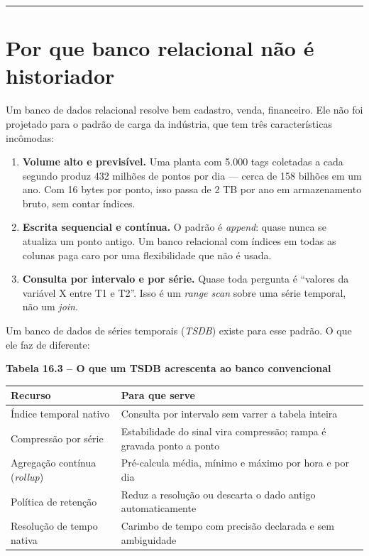 \begin{center}\rule{0.5\linewidth}{0.5pt}\end{center}

\section{Por que banco relacional não é historiador}\label{por-que-banco-relacional-nuxe3o-uxe9-historiador}

Um banco de dados relacional resolve bem cadastro, venda, financeiro. Ele não foi projetado para o
padrão de carga da indústria, que tem três características incômodas:

\begin{enumerate}
\def\labelenumi{\arabic{enumi}.}
\tightlist
\item
  \textbf{Volume alto e previsível.} Uma planta com 5.000 tags coletadas a cada segundo produz
  432 milhões de pontos por dia --- cerca de 158 bilhões em um ano. Com 16 bytes por ponto, isso
  passa de 2 TB por ano em armazenamento bruto, sem contar índices.
\item
  \textbf{Escrita sequencial e contínua.} O padrão é \emph{append}: quase nunca se atualiza um ponto antigo.
  Um banco relacional com índices em todas as colunas paga caro por uma flexibilidade que não é
  usada.
\item
  \textbf{Consulta por intervalo e por série.} Quase toda pergunta é ``valores da variável X entre T1 e
  T2''. Isso é um \emph{range scan} sobre uma série temporal, não um \emph{join}.
\end{enumerate}

Um banco de dados de séries temporais (\emph{TSDB}) existe para esse padrão. O que ele faz de diferente:

\textbf{Tabela 16.3 -- O que um TSDB acrescenta ao banco convencional}

\begin{longtable}[]{@{}
  >{\raggedright\arraybackslash}p{}
  >{\raggedright\arraybackslash}p{}@{}}
\toprule\noalign{}
\begin{minipage}[b]{\linewidth}\raggedright
Recurso
\end{minipage} & \begin{minipage}[b]{\linewidth}\raggedright
Para que serve
\end{minipage} \\
\midrule\noalign{}
\endhead
\bottomrule\noalign{}
\endlastfoot
Índice temporal nativo & Consulta por intervalo sem varrer a tabela inteira \\
Compressão por série & Estabilidade do sinal vira compressão; rampa é gravada ponto a ponto \\
Agregação contínua (\emph{rollup}) & Pré-calcula média, mínimo e máximo por hora e por dia \\
Política de retenção & Reduz a resolução ou descarta o dado antigo automaticamente \\
Resolução de tempo nativa & Carimbo de tempo com precisão declarada e sem ambiguidade \\
\end{longtable}

